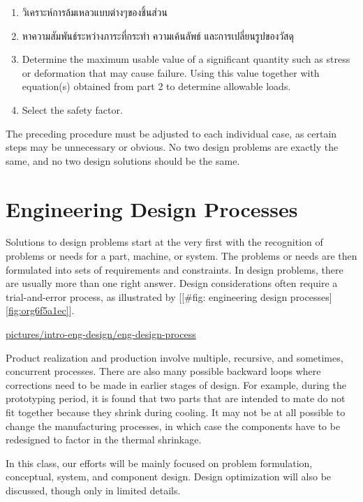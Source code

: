\documentclass[a4paper,openany,12pt]{book}
\begin{document}
\begin{enumerate}
\item วิเคราะห์การล้มเหลวแบบต่างๆของชิ้นส่วน

\item หาความสัมพันธ์ระหว่างภาระที่กระทำ ความเค้นลัพธ์ และการเปลี่ยนรูปของวัสดุ

\item Determine the maximum usable value of a significant quantity such as
stress or deformation that may cause failure. Using this value
together with equation(s) obtained from part 2 to determine allowable
loads.

\item Select the safety factor.
\end{enumerate}

The preceding procedure must be adjusted to each individual case, as
certain steps may be unnecessary or obvious. No two design problems are
exactly the same, and no two design solutions should be the same.

\section{Engineering Design Processes}
\label{sec:org14a0e62}
Solutions to design problems start at the very first with the
recognition of problems or needs for a part, machine, or system. The
problems or needs are then formulated into sets of requirements and
constraints. In design problems, there are usually more than one right
answer. Design considerations often require a trial-and-error process,
as illustrated by
[[\#fig: engineering design processes]\ref{fig:org6f5a1ec}].


\url{pictures/intro-eng-design/eng-design-process}

Product realization and production involve multiple, recursive, and
sometimes, concurrent processes. There are also many possible backward
loops where corrections need to be made in earlier stages of design. For
example, during the prototyping period, it is found that two parts that
are intended to mate do not fit together because they shrink during
cooling. It may not be at all possible to change the manufacturing
processes, in which case the components have to be redesigned to factor
in the thermal shrinkage.

In this class, our efforts will be mainly focused on problem
formulation, conceptual, system, and component design. Design
optimization will also be discussed, though only in limited details.
\end{document}
